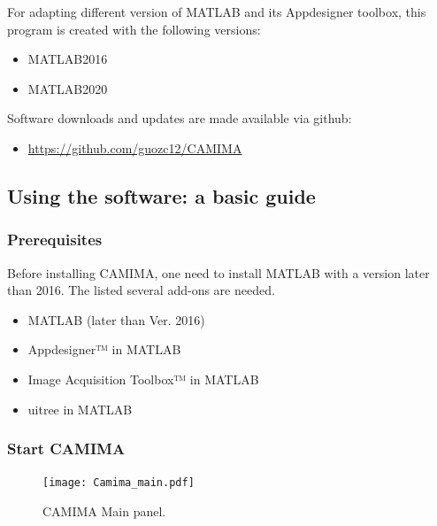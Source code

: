 For adapting different version of MATLAB and its Appdesigner toolbox, this program is created with the following versions:
\begin{itemize}[noitemsep,topsep=0pt]
\item MATLAB2016
\item MATLAB2020
\end{itemize}

Software downloads and updates are made available via github:
\begin{itemize}[noitemsep,topsep=0pt]
\item \href{https://github.com/guozc12/CAMIMA}{https://github.com/guozc12/CAMIMA}
\end{itemize}

\subsection{Using the software: a basic guide}
\subsubsection{Prerequisites}
Before installing CAMIMA, one need to install MATLAB with a version later than 2016. The listed several add-ons are needed.
\begin{itemize}[noitemsep,topsep=0pt]
    \item MATLAB (later than Ver. 2016)
    \item Appdesigner™ in MATLAB
    \item Image Acquisition Toolbox™ in MATLAB
    \item uitree in MATLAB
\end{itemize}

\subsubsection{Start CAMIMA}
\begin{figure}[htb]
\begin{center}
\texttt{[image: Camima\_main.pdf]}
\end{center}
\caption[CAMIMA main panel]{CAMIMA Main panel.}
\label{Camima_main}
\end{figure}

